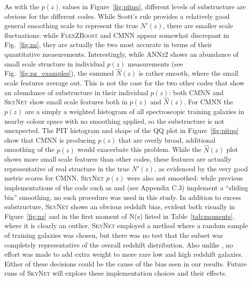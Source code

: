 As with the $p(z)$ values in Figure~\ref{fig:pitqq}, different levels of substructure are obvious for the different codes.
While Scott's rule provides a relatively good general smoothing scale to represent the true $N'(z)$, there are smaller scale fluctuations: while \textsc{FlexZBoost} and \textsc{CMNN} appear somewhat discrepant in Fig.~\ref{fig:nz}, they are actually the two most accurate in terms of their quantitative measurements.
Interestingly, while \textsc{ANNz2} shows an abundance of small scale structure in individual $p(z)$ measurements (see Fig.~\ref{fig:pz_examples}), the summed $\hat{N}(z)$ is rather smooth, where the small scale features average out.  This is not the case for the two other codes that show an abundance of substructure in their individual $p(z)$: both \textsc{CMNN} and \textsc{SkyNet} show small scale features both in $p(z)$ and $\hat{N}(z)$.  For \textsc{CMNN} the $p(z)$ are a simply a weighted histogram of all spectroscopic training galaxies in nearby colour space with no smoothing applied, so the substructure is not unexpected.  The PIT histogram and shape of the QQ plot in Figure~\ref{fig:pitqq} show that \textsc{CMNN} is producing $p(z)$ that are overly broad, additional smoothing of the $p(z)$ would exacerbate this problem.  While the $\hat{N}(z)$ plot shows more small scale features than other codes, these features are actually representative of real structure in the true $N'(z)$, as evidenced by the very good metric scores for \textsc{CMNN}.  \textsc{SkyNet} $p(z)$ were also not smoothed: while previous implementations of the code such as \citet{Sanchez:14} and \citet{Bonnett:15} (see Appendix C.3) implement a ``sliding bin'' smoothing, no such procedure was used in this study.  In addition to excess substructure, \textsc{SkyNet} shows an obvious redshift bias, evident both visually in Figure~\ref{fig:nz} and in the first moment of N(z) listed in Table~\ref{tab:moments}, where it is clearly an outlier.  \textsc{SkyNet} employed a method where a random sample of training galaxies was chosen, but there was no test that the subset was completely representative of the overall redshift distribution.  Also unlike \citet{Bonnett:15}, no effort was made to add extra weight to more rare low and high redshift galaxies.  Either of these decisions could be the cause of the bias seen in our results.  Future runs of \textsc{SkyNet} will explore these implementation choices and their effects.


